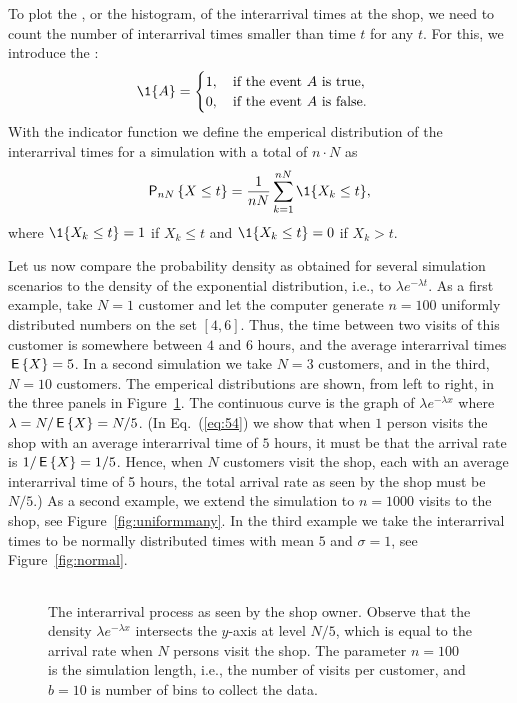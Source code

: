 To plot the , or the
histogram, of the interarrival times at the shop, we need to count the
number of interarrival times smaller than time $t$ for any $t$.  For
this, we introduce the :
\begin{equation*}
  \1{A} =
  \begin{cases}
    1, \quad\text{if the event $A$ is true},\\
    0, \quad\text{if the event $A$ is false}.
  \end{cases}
\end{equation*}
With the indicator function we define the emperical distribution of the
interarrival times for a simulation with a total of $n\cdot N$ as
\begin{equation*}
  \P{X \leq t}_{nN} = \frac1{nN}\sum_{k=1}^{nN} \1{X_k\leq t},
\end{equation*}
where $\1{X_k\leq t}=1$ if $X_k\leq t$ and $\1{X_k\leq t}=0$
if $X_k> t$.  

Let us now compare the probability density as
obtained for several simulation scenarios to the density of the
exponential distribution, i.e., to $\lambda e^{-\lambda t}$.  As a
first example, take $N=1$ customer and let the computer generate
$n=100$ uniformly distributed numbers on the set $[4, 6]$.  Thus, the
time between two visits of this customer is somewhere between $4$ and
$6$ hours, and the average interarrival times $\,\mathsf{E}\left\{X\right\} = 5$. In a second
simulation we take $N=3$ customers, and in the third, $N=10$
customers. The emperical distributions are shown, from left to right,
in the three panels in Figure~\ref{fig:uniformfew}. The continuous
curve is the graph of $\lambda e^{-\lambda x}$ where
$\lambda = N/\,\mathsf{E}\left\{X\right\} = N/5$. (In Eq.~(\ref{eq:54}) we show that when $1$
person visits the shop  with an average interarrival time of $5$
hours, it must be that the arrival rate  is $1/\,\mathsf{E}\left\{X\right\} = 1/5$. Hence, when $N$ customers visit the shop, each with an average interarrival time of 5 hours, the total arrival rate as seen by the shop must be $N/5$.)  As a second
example, we extend the simulation to $n=1000$ visits to the shop, see
Figure~\ref{fig:uniformmany}. In the third example we take the
interarrival times to be normally distributed times with mean $5$ and
$\sigma=1$, see Figure~\ref{fig:normal}.

\begin{figure}[ht]
  \centering
  \begin{tabular}[h]{c}
 \\
  \end{tabular}
  \caption{The interarrival process as seen by the shop owner. Observe
    that the density $\lambda e^{-\lambda x}$ intersects the $y$-axis
    at level $N/5$, which is equal to the arrival rate when $N$
    persons visit the shop. The parameter $n=100$ is the simulation
    length, i.e., the number of visits per customer, and $b=10$ is
    number of bins to collect the data.}
  \label{fig:uniformfew}
\end{figure}

